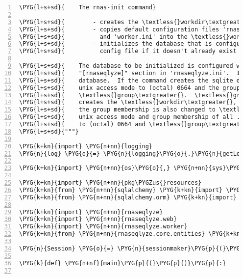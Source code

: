 \begin{Verbatim}[commandchars=\\\{\},numbers=left,firstnumber=1,stepnumber=5]
\PYG{l+s+sd}{    The rnas-init command}

\PYG{l+s+sd}{        - creates the \textless{}workdir\textgreater{} if it does not already exist}
\PYG{l+s+sd}{        - copies default configuration files 'rnaseqlyze.ini', 'web.ini'}
\PYG{l+s+sd}{          and 'worker.ini' into the \textless{}workdir\textgreater{} if they do not already exist.}
\PYG{l+s+sd}{        - initializes the database that is configured in the 'rnaseqlyze.ini'}
\PYG{l+s+sd}{          config file if it doesn't already exist and --recreatedb is not given.}

\PYG{l+s+sd}{    The database to be initialized is configured with "db\PYGZus{}url =" in the}
\PYG{l+s+sd}{    "[rnaseqlyze]" section in 'rnaseqlyze.ini'.  It is expected to be an sqlite}
\PYG{l+s+sd}{    database.  If the command creates the sqlite database file, it changes it's}
\PYG{l+s+sd}{    unix access mode to (octal) 0664 and the group membership is changed to}
\PYG{l+s+sd}{    \textless{}group\textgreater{}.  \textless{}group\textgreater{} can be confgured in 'rnaseqlyze.ini'.  If the command}
\PYG{l+s+sd}{    creates the \textless{}workdir\textgreater{}, it changes it's unix access mode to (octal) 0775 and}
\PYG{l+s+sd}{    the group membership is also changed to \textless{}group\textgreater{}.  The command changes the}
\PYG{l+s+sd}{    unix access mode and group membership of all .log files inside the workdir}
\PYG{l+s+sd}{    to (octal) 0664 and \textless{}group\textgreater{}.}
\PYG{l+s+sd}{"""}

\PYG{k+kn}{import} \PYG{n+nn}{logging}
\PYG{n}{log} \PYG{o}{=} \PYG{n}{logging}\PYG{o}{.}\PYG{n}{getLogger}\PYG{p}{(}\PYG{n}{\PYGZus{}\PYGZus{}name\PYGZus{}\PYGZus{}}\PYG{p}{)}

\PYG{k+kn}{import} \PYG{n+nn}{os}\PYG{o}{,} \PYG{n+nn}{sys}\PYG{o}{,} \PYG{n+nn}{grp}\PYG{o}{,} \PYG{n+nn}{shutil}

\PYG{k+kn}{import} \PYG{n+nn}{pkg\PYGZus{}resources}
\PYG{k+kn}{from} \PYG{n+nn}{sqlalchemy} \PYG{k+kn}{import} \PYG{n}{create\PYGZus{}engine}
\PYG{k+kn}{from} \PYG{n+nn}{sqlalchemy.orm} \PYG{k+kn}{import} \PYG{n}{sessionmaker}

\PYG{k+kn}{import} \PYG{n+nn}{rnaseqlyze}
\PYG{k+kn}{import} \PYG{n+nn}{rnaseqlyze.web}
\PYG{k+kn}{import} \PYG{n+nn}{rnaseqlyze.worker}
\PYG{k+kn}{from} \PYG{n+nn}{rnaseqlyze.core.entities} \PYG{k+kn}{import} \PYG{n}{Entity}

\PYG{n}{Session} \PYG{o}{=} \PYG{n}{sessionmaker}\PYG{p}{(}\PYG{p}{)}

\PYG{k}{def} \PYG{n+nf}{main}\PYG{p}{(}\PYG{p}{)}\PYG{p}{:}


\end{Verbatim}
